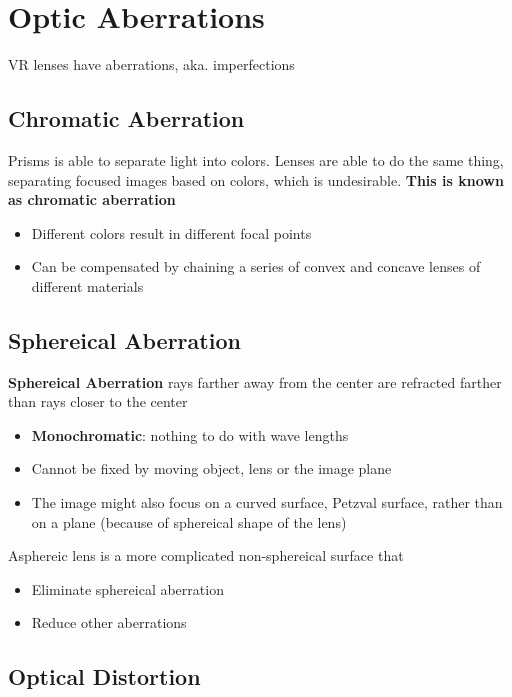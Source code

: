 \section{Optic Aberrations}

VR lenses have aberrations, aka. imperfections

\subsection{Chromatic Aberration}

  Prisms is able to separate light into colors. Lenses are able to do the same
  thing, separating focused images based on colors, which is undesirable.
  \textbf{This is known as chromatic aberration}

  \begin{itemize}
    \item Different colors result in different focal points
    \item Can be compensated by chaining a series of convex and concave lenses
    of different materials
  \end{itemize}

\subsection{Sphereical Aberration}

  \textbf{Sphereical Aberration} rays farther away from the center are
  refracted farther than rays closer to the center

  \begin{itemize}
    \item \textbf{Monochromatic}: nothing to do with wave lengths
    \item Cannot be fixed by moving object, lens or the image plane
    \item The image might also focus on a curved surface, Petzval surface,
    rather than on a plane (because of sphereical shape of the lens)
  \end{itemize}

  Asphereic lens is a more complicated non-sphereical surface that

  \begin{itemize}
    \item Eliminate sphereical aberration
    \item Reduce other aberrations
  \end{itemize}

\subsection{Optical Distortion}


